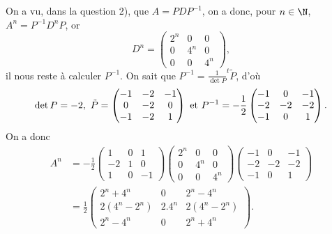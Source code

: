 {\begin{enumerate}
{On a vu, dans la question 2), que $A=PDP^{-1}$, on a donc, pour $n\in\N$, $A^n=P^{-1}D^nP$, or
$$D^n=\begin{pmatrix}2^n&0&0 \\ 0&4^n&0 \\  0&0&4^n\end{pmatrix},$$
il nous reste \`a calculer $P^{-1}$. On sait que $P^{-1}={\frac{1}{\det P}}^t\!\!\tilde P$, d'o\`u
$$\det P=-2,\ \tilde P=\begin{pmatrix}-1&-2&-1 \\ 0&-2&0 \\  -1&-2&1\end{pmatrix}\ {\hbox{et}}\ 
P^{-1}=-{\frac{1}{2}}\begin{pmatrix}-1&0&-1 \\ -2&-2&-2 \\  -1&0&1\end{pmatrix}.$$
On a donc
\begin{align*}A^n&=-{\frac{1}{2}}\begin{pmatrix}1&0&1 \\ -2&1&0 \\  1&0&-1\end{pmatrix}\begin{pmatrix}2^n&0&0 \\ 0&4^n&0 \\  0&0&4^n\end{pmatrix}\begin{pmatrix}-1&0&-1 \\ -2&-2&-2 \\  -1&0&1\end{pmatrix} \\ &={\frac{1}{2}}
\begin{pmatrix}2^n+4^n&0&2^n-4^n \\ 2(4^n-2^n)&2.4^n&2(4^n-2^n) \\  2^n-4^n&0&2^n+4^n\end{pmatrix}.
\end{align*}}
\end{enumerate}
}